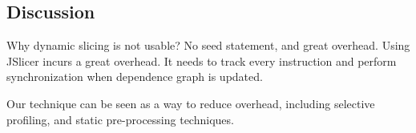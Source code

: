 \subsection{Discussion}
Why dynamic slicing is not usable? No seed statement, and great overhead. Using JSlicer incurs
a great overhead. It needs to track every instruction and
perform synchronization when dependence graph is updated.

Our technique can be seen as a way to reduce overhead,
including selective profiling, and static pre-processing
techniques.

